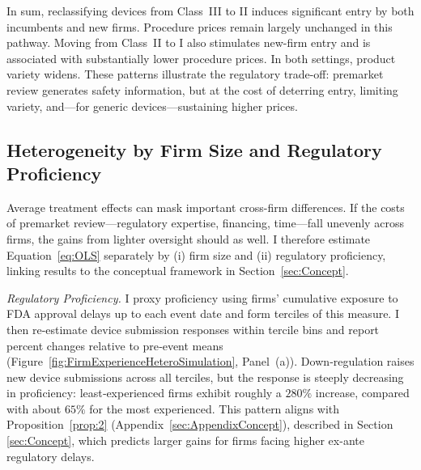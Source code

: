 \documentclass[letterpaper,12pt]{article}
\theoremstyle{definition}
\begin{document}
In sum, reclassifying devices from Class~III to II induces significant entry by both incumbents and new firms. Procedure prices remain largely unchanged in this pathway. Moving from Class~II to I also stimulates new-firm entry and is associated with substantially lower procedure prices. In both settings, product variety widens. These patterns illustrate the regulatory trade-off: premarket review generates safety information, but at the cost of deterring entry, limiting variety, and---for generic devices---sustaining higher prices.




\subsection{Heterogeneity by Firm Size and Regulatory Proficiency}\label{sec:heterogeneityresults}

Average treatment effects can mask important cross-firm differences. If the costs of premarket review---regulatory expertise, financing, time---fall unevenly across firms, the gains from lighter oversight should as well. I therefore estimate Equation~\ref{eq:OLS} separately by (i) firm size and (ii) regulatory proficiency, linking results to the conceptual framework in Section~\ref{sec:Concept}.

 
\textit{Regulatory Proficiency.} I proxy proficiency using firms’ cumulative exposure to FDA approval delays up to each event date and form terciles of this measure. I then re‐estimate device submission responses within tercile bins and report percent changes relative to pre‐event means (Figure~\ref{fig:FirmExperienceHeteroSimulation}, Panel~(a)).\footnotemark {} Down‐regulation raises new device submissions across all terciles, but the response is steeply decreasing in proficiency: least‐experienced firms exhibit roughly a $280\%$ increase, compared with about $65\%$ for the most experienced.\footnotemark {} This pattern aligns with Proposition~\ref{prop:2} (Appendix~\ref{sec:AppendixConcept}), described in Section \ref{sec:Concept}, which predicts larger gains for firms facing higher ex-ante regulatory delays.\footnotemark {}
\end{document}
